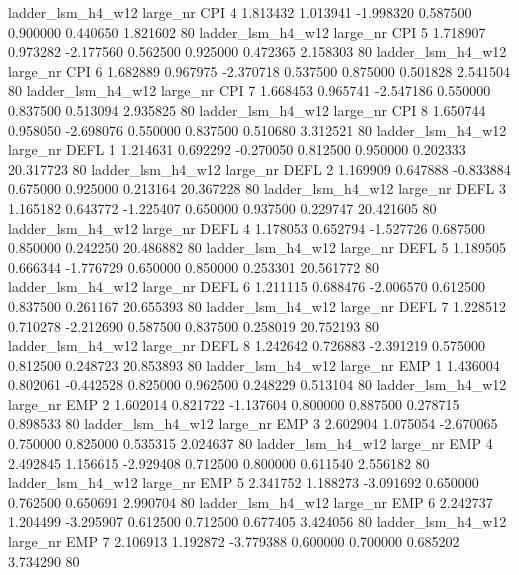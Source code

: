   ladder_lsm_h4_w12   large_nr      CPI                 4  1.813432  1.013941  -1.998320 0.587500 0.900000  0.440650    1.821602 80
  ladder_lsm_h4_w12   large_nr      CPI                 5  1.718907  0.973282  -2.177560 0.562500 0.925000  0.472365    2.158303 80
  ladder_lsm_h4_w12   large_nr      CPI                 6  1.682889  0.967975  -2.370718 0.537500 0.875000  0.501828    2.541504 80
  ladder_lsm_h4_w12   large_nr      CPI                 7  1.668453  0.965741  -2.547186 0.550000 0.837500  0.513094    2.935825 80
  ladder_lsm_h4_w12   large_nr      CPI                 8  1.650744  0.958050  -2.698076 0.550000 0.837500  0.510680    3.312521 80
  ladder_lsm_h4_w12   large_nr     DEFL                 1  1.214631  0.692292  -0.270050 0.812500 0.950000  0.202333   20.317723 80
  ladder_lsm_h4_w12   large_nr     DEFL                 2  1.169909  0.647888  -0.833884 0.675000 0.925000  0.213164   20.367228 80
  ladder_lsm_h4_w12   large_nr     DEFL                 3  1.165182  0.643772  -1.225407 0.650000 0.937500  0.229747   20.421605 80
  ladder_lsm_h4_w12   large_nr     DEFL                 4  1.178053  0.652794  -1.527726 0.687500 0.850000  0.242250   20.486882 80
  ladder_lsm_h4_w12   large_nr     DEFL                 5  1.189505  0.666344  -1.776729 0.650000 0.850000  0.253301   20.561772 80
  ladder_lsm_h4_w12   large_nr     DEFL                 6  1.211115  0.688476  -2.006570 0.612500 0.837500  0.261167   20.655393 80
  ladder_lsm_h4_w12   large_nr     DEFL                 7  1.228512  0.710278  -2.212690 0.587500 0.837500  0.258019   20.752193 80
  ladder_lsm_h4_w12   large_nr     DEFL                 8  1.242642  0.726883  -2.391219 0.575000 0.812500  0.248723   20.853893 80
  ladder_lsm_h4_w12   large_nr      EMP                 1  1.436004  0.802061  -0.442528 0.825000 0.962500  0.248229    0.513104 80
  ladder_lsm_h4_w12   large_nr      EMP                 2  1.602014  0.821722  -1.137604 0.800000 0.887500  0.278715    0.898533 80
  ladder_lsm_h4_w12   large_nr      EMP                 3  2.602904  1.075054  -2.670065 0.750000 0.825000  0.535315    2.024637 80
  ladder_lsm_h4_w12   large_nr      EMP                 4  2.492845  1.156615  -2.929408 0.712500 0.800000  0.611540    2.556182 80
  ladder_lsm_h4_w12   large_nr      EMP                 5  2.341752  1.188273  -3.091692 0.650000 0.762500  0.650691    2.990704 80
  ladder_lsm_h4_w12   large_nr      EMP                 6  2.242737  1.204499  -3.295907 0.612500 0.712500  0.677405    3.424056 80
  ladder_lsm_h4_w12   large_nr      EMP                 7  2.106913  1.192872  -3.779388 0.600000 0.700000  0.685202    3.734290 80
